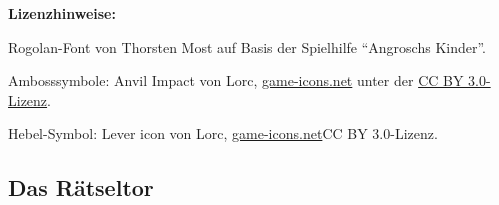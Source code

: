 \documentclass[openright]{Ilaris}
\begin{document}
\vfill
\footnotesize
\textbf{Lizenzhinweise:}
\label{lizenz}
\bigskip

Rogolan-Font von Thorsten Most auf Basis der Spielhilfe \enquote{Angroschs Kinder}.

Ambosssymbole: Anvil Impact von Lorc, \href{https://game-icons.net/1x1/lorc/anvil-impact.html}{game-icons.net} unter der \href{https://creativecommons.org/licenses/by/3.0/}{CC BY 3.0-Lizenz}.

Hebel-Symbol: Lever icon von Lorc, \href{https://game-icons.net/1x1/lorc/lever.html}{game-icons.net}{CC BY 3.0-Lizenz}.
\normalsize
\newpage

\subsection{Das Rätseltor}
\label{raetsel}
\newpage
{}
\newpage







\end{document}
